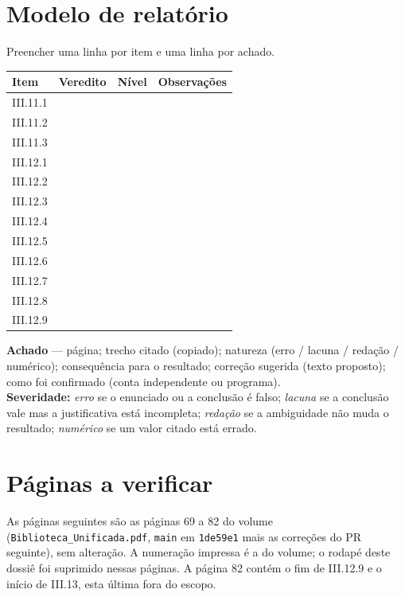 \documentclass[11pt,a4paper]{article}
\begin{document}
\section{Modelo de relatório}
Preencher uma linha por item e uma linha por achado.
\begin{center}\small\begin{tabular}{|p{.12\linewidth}|p{.08\linewidth}|p{.07\linewidth}|p{.42\linewidth}|}\hline
\textbf{Item} & \textbf{Veredito} & \textbf{Nível} & \textbf{Observações}\\\hline
III.11.1 & & & \\\hline III.11.2 & & & \\\hline III.11.3 & & & \\\hline III.12.1 & & & \\\hline III.12.2 & & & \\\hline III.12.3 & & & \\\hline III.12.4 & & & \\\hline III.12.5 & & & \\\hline III.12.6 & & & \\\hline III.12.7 & & & \\\hline III.12.8 & & & \\\hline III.12.9 & & & \\\hline
\end{tabular}\end{center}
\textbf{Achado} — página; trecho citado (copiado); natureza (erro / lacuna / redação / numérico); consequência para o resultado; correção sugerida (texto proposto); como foi confirmado (conta independente ou programa).\\
\textbf{Severidade:} \emph{erro} se o enunciado ou a conclusão é falso; \emph{lacuna} se a conclusão vale mas a justificativa está incompleta; \emph{redação} se a ambiguidade não muda o resultado; \emph{numérico} se um valor citado está errado.

\clearpage
\appendix
\section{Páginas a verificar}
As páginas seguintes são as páginas 69 a 82 do volume (\texttt{Biblioteca\_Unificada.pdf}, \texttt{main} em \texttt{1de59e1} mais as correções do PR seguinte), sem alteração. A numeração impressa é a do volume; o rodapé deste dossiê foi suprimido nessas páginas. A página 82 contém o fim de III.12.9 e o início de III.13, esta última fora do escopo.
\clearpage

\end{document}
